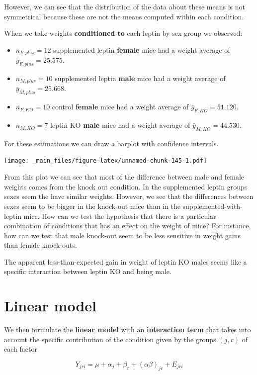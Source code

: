 \documentclass[
]{book}
\begin{document}
However, we can see that the distribution of the data about these means is not symmetrical because these are not the means computed within each condition.

When we take weights \textbf{conditioned to} each leptin by sex group we observed:

\begin{itemize}
\item
  \(n_{F,plus}=12\) supplemented leptin \textbf{female} mice had a weight average of \(\bar{y}_{F,plus}=25.575\).
\item
  \(n_{M,plus}=10\) supplemented leptin \textbf{male} mice had a weight average of \(\bar{y}_{M,plus}=25.668\).
\item
  \(n_{F,KO}=10\) control \textbf{female} mice had a weight average of \(\bar{y}_{F,KO}=51.120\).
\item
  \(n_{M,KO}=7\) leptin KO \textbf{male} mice had a weight average of \(\bar{y}_{M,KO}=44.530\).
\end{itemize}

For these estimations we can draw a barplot with confidence intervals.

\texttt{[image: \_main\_files/figure-latex/unnamed-chunk-145-1.pdf]}

From this plot we can see that most of the difference between male and female weights comes from the knock out condition. In the supplemented leptin groups sexes seem the have similar weights. However, we see that the differences between sexes seem to be bigger in the knock-out mice than in the supplemented-with-leptin mice.
How can we test the hypothesis that there is a particular combination of conditions that has an effect on the weight of mice? For instance, how can we test that male knock-out seem to be less sensitive in weight gains than female knock-outs.

The apparent less-than-expected gain in weight of leptin KO males seems like a specific interaction between leptin KO and being male.

\hypertarget{linear-model-2}{%
\section{Linear model}\label{linear-model-2}}

We then formulate the \textbf{linear model} with an \textbf{interaction term} that takes into account the specific contribution of the condition given by the groups \((j,r)\) of each factor

\[Y_{jri} = \mu + \alpha_j + \beta_r + (\alpha\beta)_{jr} + E_{jri}\]
\end{document}
